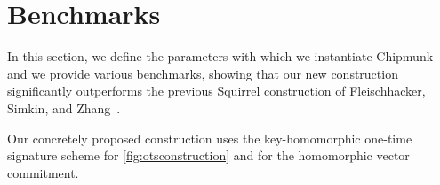 \section{Benchmarks}\label{sec:benchmarks}


In this section, we define the parameters with which we instantiate Chipmunk and we provide various benchmarks, showing that our new construction significantly outperforms the previous Squirrel construction of Fleischhacker, Simkin, and Zhang~\cite{CCS:FleSimZha22}.

Our concretely proposed construction uses the key-homomorphic one-time signature scheme for \autoref{fig:otsconstruction} and \eprint{$\hvcencoded$}\cameraready{$\hvccamera$} for the homomorphic vector commitment.

